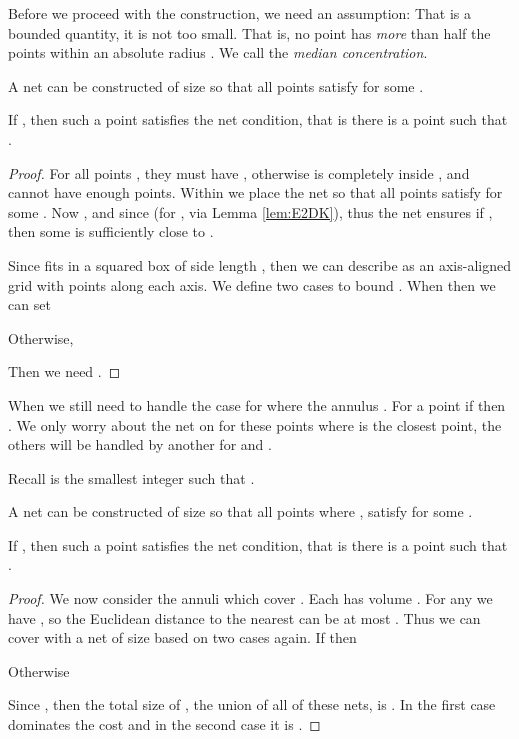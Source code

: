 \documentclass[11pt]{myclass}
\begin{document}
Before we proceed with the construction, we need an assumption:  That  is a bounded quantity, it is not too small.  That is,  no point has \emph{more} than half the points within an absolute radius .  We call  the \emph{median concentration}.  

\begin{lemma}
\label{lem:N0}
A net  can be constructed of size  so that all points  satisfy  for some .
\end{lemma}
If , then such a point satisfies the net condition, that is there is a point  such that   
.  
\begin{proof}
For all points , they must have , otherwise  is completely inside , and cannot have enough points.   
Within  we place the net  so that all points  satisfy  for some .  
Now , and since  (for , via Lemma \ref{lem:E2DK}), thus the net ensures if , then some  is sufficiently close to .  

Since  fits in a squared box of side length , then we can describe  as an axis-aligned grid with  points along each axis.  We define two cases to bound .  When  then we can set

Otherwise, 

Then we need .  
\end{proof}

When  we still need to handle the case for  where the annulus .  
For a point  if  then .  We only worry about the net  on  for these points where  is the closest point, the others will be handled by another  for  and .  

Recall  is the smallest integer  such that .  

\begin{lemma}
\label{lem:Ann-net}
A net  can be constructed of size  so that all points  where ,  satisfy  for some .  
\end{lemma}

If , then such a point satisfies the net condition, that is there is a point  such that   
.  


\begin{proof}
We now consider the  annuli  which cover .  Each  has volume .  For any  we have , so the Euclidean distance to the nearest  can be at most . Thus we can cover  with a net  of size  based on two cases again.  If  then

Otherwise

Since , then
the total size of , the union of all of these nets, is .  
In the first case  dominates the cost and in the second case it is .  
\end{proof}
\end{document}
